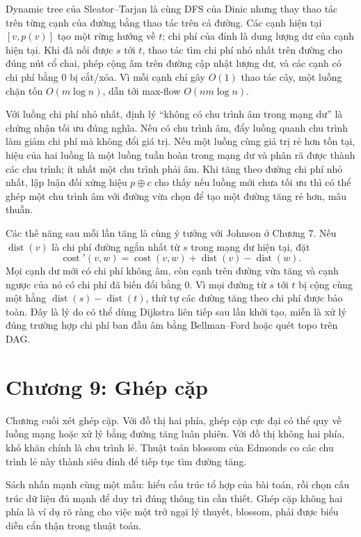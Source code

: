 \documentclass[11pt]{article}
\begin{document}
Dynamic tree của Sleator--Tarjan là cùng DFS của Dinic nhưng thay thao tác trên
từng cạnh của đường bằng thao tác trên cả đường. Các cạnh hiện tại \([v,p(v)]\)
tạo một rừng hướng về \(t\); chi phí của đỉnh là dung lượng dư của cạnh hiện tại.
Khi đã nối được \(s\) tới \(t\), thao tác tìm chi phí nhỏ nhất trên đường cho đúng
nút cổ chai, phép cộng âm trên đường cập nhật lượng dư, và các cạnh có chi phí
bằng \(0\) bị cắt/xóa. Vì mỗi cạnh chỉ gây \(O(1)\) thao tác cây, một luồng chặn
tốn \(O(m\log n)\), dẫn tới max-flow \(O(nm\log n)\).

Với luồng chi phí nhỏ nhất, định lý ``không có chu trình âm trong mạng dư'' là
chứng nhận tối ưu đúng nghĩa. Nếu có chu trình âm, đẩy luồng quanh chu trình làm
giảm chi phí mà không đổi giá trị. Nếu một luồng cùng giá trị rẻ hơn tồn tại, hiệu
của hai luồng là một luồng tuần hoàn trong mạng dư và phân rã được thành các
chu trình; ít nhất một chu trình phải âm. Khi tăng theo đường chi phí nhỏ nhất,
lập luận đối xứng hiệu \(p\oplus c\) cho thấy nếu luồng mới chưa tối ưu thì có thể
ghép một chu trình âm với đường vừa chọn để tạo một đường tăng rẻ hơn, mâu thuẫn.

Các thế năng sau mỗi lần tăng là cùng ý tưởng với Johnson ở Chương 7. Nếu
\(\operatorname{dist}(v)\) là chi phí đường ngắn nhất từ \(s\) trong mạng dư hiện
tại, đặt
\[
  \operatorname{cost}'(v,w)=
  \operatorname{cost}(v,w)+\operatorname{dist}(v)-\operatorname{dist}(w).
\]
Mọi cạnh dư mới có chi phí không âm, còn cạnh trên đường vừa tăng và cạnh ngược
của nó có chi phí đã biến đổi bằng \(0\). Vì mọi đường từ \(s\) tới \(t\) bị cộng
cùng một hằng \(\operatorname{dist}(s)-\operatorname{dist}(t)\), thứ tự các đường
tăng theo chi phí được bảo toàn. Đây là lý do có thể dùng Dijkstra liên tiếp sau
lần khởi tạo, miễn là xử lý đúng trường hợp chi phí ban đầu âm bằng Bellman--Ford
hoặc quét topo trên DAG.

\section{Chương 9: Ghép cặp}

Chương cuối xét ghép cặp. Với đồ thị hai phía, ghép cặp cực đại có thể quy về
luồng mạng hoặc xử lý bằng đường tăng luân phiên. Với đồ thị không hai phía,
khó khăn chính là chu trình lẻ. Thuật toán blossom của Edmonds co các chu
trình lẻ này thành siêu đỉnh để tiếp tục tìm đường tăng.

Sách nhấn mạnh cùng một mẫu: hiểu cấu trúc tổ hợp của bài toán, rồi chọn cấu
trúc dữ liệu đủ mạnh để duy trì đúng thông tin cần thiết. Ghép cặp không hai
phía là ví dụ rõ ràng cho việc một trở ngại lý thuyết, blossom, phải được
biểu diễn cẩn thận trong thuật toán.
\end{document}
